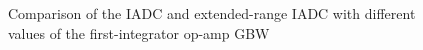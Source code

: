 \begin{figure}[h]
\centering
{}
\qquad
{}
\caption{Comparison of the IADC and extended-range IADC with different values of the first-integrator op-amp GBW}
\label{SNR_GBW1}
\end{figure}

